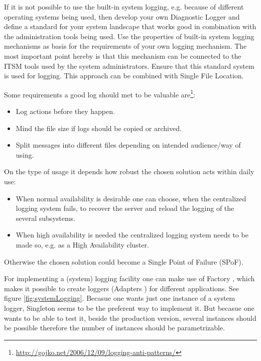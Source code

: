
If it is not possible to use the built-in system logging, e.g. because of different operating systems being used, then develop your own {\sc Diagnostic Logger} \cite{Harrison2011} and define a standard for your system landscape that works good in combination with the administration tools being used. Use the properties of built-in system logging mechanisms as basis for the requirements of your own logging mechanism. The most important point hereby is that this mechanism can be connected to the ITSM tools used by the system administrators. Ensure that this standard system is used for logging. This approach can be combined with {\sc Single File Location}.

Some requirements a good log should met to be valuable are\footnote{\url{http://gojko.net/2006/12/09/logging-anti-patterns/}}:
\begin{itemize}
	\item Log actions before they happen.
	\item Mind the file size if logs should be copied or archived.
	\item Split messages into different files depending on intended audience/way of using.
\end{itemize}

On the type of usage it depends how robust the chosen solution acts within daily use:
\begin{itemize}
	\item When normal availability is desirable one can choose, when the  centralized logging system fails, to recover the server and reload the logging of the several subsystems.
	\item When high availability is needed the centralized logging system needs to be made so, e.g. as a High Availability cluster.
\end{itemize}
Otherwise the chosen solution could become a Single Point of Failure (SPoF).

For implementing a (system) logging facility one can make use of {\sc  Factory} \cite{Gamma95}, which makes it possible to create loggers ({\sc  Adapters} \cite{Gamma95}) for different applications. See figure \ref{fig:systemLogging}. Becasue one wants just one instance of a system logger, {\sc  Singleton} \cite{Gamma95} seems to be the preferent way to implement it. But becasue one wants to be able to test  it, beside the production version, several instances should be possible therefore the number of instances should be parametrizable.

